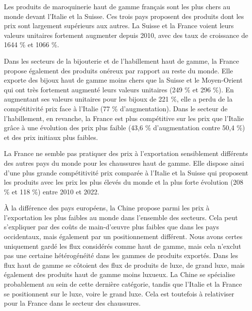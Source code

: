 \documentclass[french,10pt,a4paper]{article}
\begin{document}
Les produits de maroquinerie haut de gamme français sont les plus chers au monde devant l'Italie et la Suisse. Ces trois pays proposent des produits dont les prix sont largement supérieurs aux autres. La Suisse et la France voient leurs valeurs unitaires fortement augmenter depuis 2010, avec des taux de croissance de 1644 \% et 1066 \%.

Dans les secteurs de la bijouterie et de l'habillement haut de gamme, la France propose également des produits onéreux par rapport au reste du monde. Elle exporte des bijoux haut de gamme moins chers que la Suisse et le Moyen-Orient qui ont très fortement augmenté leurs valeurs unitaires (249 \% et 296 \%). En augmentant ses valeurs unitaires pour les bijoux de 221 \%, elle a perdu de la compétitivité prix face à l'Italie (77 \% d'augmentation). Dans le secteur de l'habillement, en revanche, la France est plus compétitive sur les prix que l'Italie grâce à une évolution des prix plus faible (43,6 \% d'augmentation contre 50,4 \%) et des prix initiaux plus faibles.

La France ne semble pas pratiquer des prix à l'exportation sensiblement différents des autres pays du monde pour les chaussures haut de gamme. Elle dispose ainsi d'une plus grande compétitivité prix comparée à l'Italie et la Suisse qui proposent les produits avec les prix les plus élevés du monde et la plus forte évolution (208 \% et 118 \%) entre 2010 et 2022.

À la différence des pays européens, la Chine propose parmi les prix à l'exportation les plus faibles au monde dans l'ensemble des secteurs. Cela peut s'expliquer par des coûts de main-d'œuvre plus faibles que dans les pays occidentaux, mais également par un positionnement différent. Nous avons certes uniquement gardé les flux considérés comme haut de gamme, mais cela n'exclut pas une certaine hétérogénéité dans les gammes de produits exportés. Dans les flux haut de gamme se côtoient des flux de produits de luxe, de grand luxe, mais également des produits haut de gamme moins luxueux. La Chine se spécialise probablement au sein de cette dernière catégorie, tandis que l'Italie et la France se positionnent sur le luxe, voire le grand luxe. Cela est toutefois à relativiser pour la France dans le secteur des chaussures.

\bigskip
\end{document}
